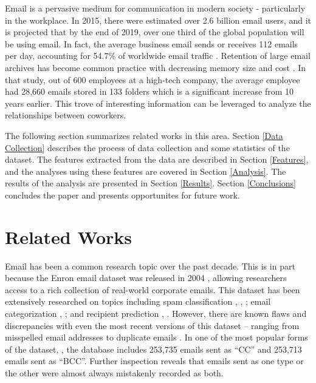 \documentclass{article}
\begin{document}
Email is a pervasive medium for communication in modern society - particularly in the workplace.  In 2015, there were estimated over 2.6 billion email users, and it is projected that by the end of 2019, over one third of the global population will be using email.  In fact, the average business email sends or receives 112 emails per day, accounting for 54.7\% of worldwide email traffic \cite{radicati_emails_2015}. Retention of large email archives has become common practice with decreasing memory size and cost \cite{fisher_revisiting_2006}.  In that study, out of 600 employees at a high-tech company, the average employee had 28,660 emails stored in 133 folders which is a significant increase from 10 years earlier.  This trove of interesting information can be leveraged to analyze the relationships between coworkers.
\par
The following section summarizes related works in this area.  Section \ref{Data Collection} describes the process of data collection and some statistics of the dataset.  The features extracted from the data are described in Section \ref{Features}, and the analyses using these features are covered in Section \ref{Analysis}.  The results of the analysis are presented in Section \ref{Results}.  Section \ref{Conclusions} concludes the paper and presents opportunites for future work.  

\section{Related Works} \label{Related Works}
Email has been a common research topic over the past decade.  This is in part because  the Enron email dataset was released in 2004 \cite{klimt_introducing_2004}, allowing researchers access to a rich collection of real-world corporate emails.  This dataset has been extensively researched on topics including spam classification \cite{martin_analyzing_2005}, \cite{gaber_e-mail_2016}, \cite{shams_classifying_2013}; email categorization \cite{he_novel_2014}, \cite{keila_structure_2005}; and recipient prediction \cite{sofershtein_predicting_2015}, \cite{hu_towards_2012}.  However, there are known flaws and discrepancies with even the most recent versions of this dataset -- ranging from misspelled email addresses \cite{nordbo_data_2014} to duplicate emails \cite{waterman_big_2014}. In one of the most popular forms of the dataset, \cite{shetty_enron_2004}, the database includes 253,735 emails sent as ``CC'' and  253,713 emails sent as ``BCC''.  Further inspection reveals that emails sent as one type or the other were almost always mistakenly recorded as both.
\end{document}
